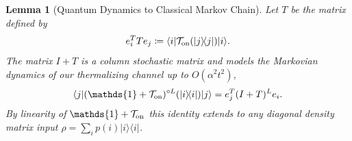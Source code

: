 \documentclass[
 amsmath,amssymb,
 aps,
onecolumn, 
nofootinbib]{revtex4-2}
\newtheorem{lemma}[theorem]{Lemma}
\newcommand{\on}{\rm on}
\newcommand{\ket}[1]{|#1\rangle}
\newcommand{\bra}[1]{\langle #1|}
\newcommand{\ketbra}[2]{| #1\rangle\! \langle #2|}
\newcommand{\bigo}[1]{O\left(#1\right)}
\newcommand{\identity}{\mathds{1}}
\begin{document}
\begin{lemma}[Quantum Dynamics to Classical Markov Chain] \label{lem:quantum_to_classical}
    Let $T$ be the matrix defined by 
    \begin{equation}
        e_i^T T e_j \coloneqq \bra{i} \mathcal{T}_{\on}(\ketbra{j}{j}) \ket{i}.
    \end{equation}
    The matrix $I + T$ is a column stochastic matrix and models the Markovian dynamics of our thermalizing channel up to $\bigo{\alpha^2 t^2}$,
    \begin{equation}
        \bra{j} (\identity + \mathcal{T}_{\on})^{\circ L} (\ketbra{i}{i}) \ket{j} = e_j^T (I + T)^L e_i.
    \end{equation}
    By linearity of $\identity + \mathcal{T}_{\on}$ this identity extends to any diagonal density matrix input $\rho = \sum_i p(i) \ketbra{i}{i}$.
\end{lemma}
\end{document}
